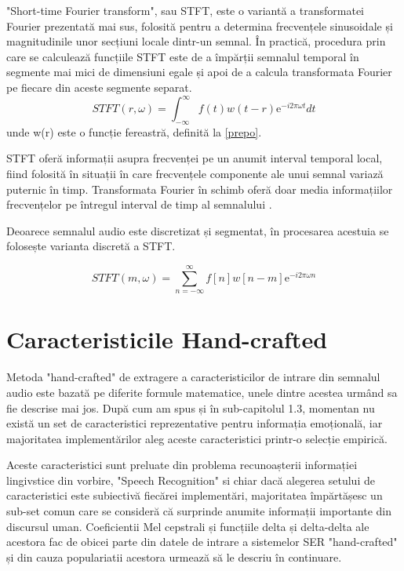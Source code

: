 \documentclass[a4paper,12pt]{book}
\begin{document}
			"Short-time Fourier transform", sau STFT, este o variantă a transformatei Fourier prezentată mai sus, folosită pentru a determina frecvențele sinusoidale și magnitudinile unor secțiuni locale dintr-un semnal. În practică, procedura prin care se calculează funcțiile STFT este de a împărții semnalul temporal în segmente mai mici de dimensiuni egale și apoi de a calcula transformata Fourier pe fiecare din aceste segmente separat. 
			\begin{equation*}
			STFT(r , \omega) = \int_{-\infty}^{\infty}  f(t) w(t-r)\mathrm{e}^{- i 2\pi \omega t}  dt
			\end{equation*}
			unde w(r) este o funcție fereastră, definită la \ref{prepo}. \par
			STFT oferă informații asupra frecvenței pe un anumit interval temporal local, fiind folosită în situații în care frecvențele componente ale unui semnal variază puternic în timp. Transformata Fourier în schimb oferă doar media informațiilor frecvențelor pe întregul interval de timp al semnalului \cite{stft2}.			
			
			Deoarece semnalul audio este discretizat și segmentat, în procesarea acestuia se folosește varianta discretă a STFT.
			
			\begin{equation}
			STFT(m ,\omega) = \sum_{n=-\infty}^{\infty}  f[n] w[n-m]\mathrm{e}^{- i 2\pi \omega n}  \label{stft}
			\end{equation}
			\section{Caracteristicile Hand-crafted} \label{hand-crafted}
			
			Metoda "hand-crafted" de extragere a caracteristicilor de intrare din semnalul audio este bazată pe diferite formule matematice, unele dintre acestea urmând sa fie descrise mai jos. După cum am spus și în sub-capitolul 1.3, momentan nu există un set de caracteristici reprezentative pentru informația emoțională, iar majoritatea implementărilor aleg aceste caracteristici printr-o selecție empirică. \par  
			Aceste caracteristici sunt preluate din problema recunoașterii informației lingivstice din vorbire, "Speech Recognition" si chiar dacă alegerea setului de caracteristici este subiectivă fiecărei implementări, majoritatea împărtășesc un sub-set comun care se consideră că surprinde anumite informații importante din discursul uman. Coeficientii Mel cepstrali și funcțiile delta și delta-delta ale acestora fac de obicei parte din datele de intrare a sistemelor SER "hand-crafted" și din cauza populariatii acestora urmează să le descriu în continuare. \par
			
\end{document}

